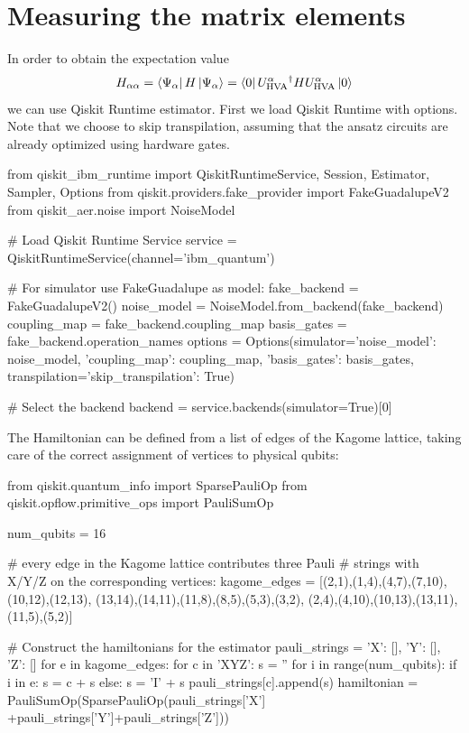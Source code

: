 \documentclass[a4paper,12pt]{article}
\begin{document}
\section{Measuring the matrix elements}\label{sec:measuring}
In order to obtain the expectation value
\begin{equation}
H_{\alpha\alpha} = \left\langle{\Psi_\alpha}\right\vert H \left\vert{\Psi_\alpha}\right\rangle 
= \left\langle{0}\right\vert U_\text{HVA}^\alpha{}^\dagger H U_\text{HVA}^\alpha \left\vert{0}\right\rangle
\end{equation}
we can use Qiskit Runtime estimator. First we load Qiskit Runtime with options. Note that we choose to skip transpilation, assuming that the ansatz circuits are already optimized using hardware gates.
\begin{python}
from qiskit_ibm_runtime import QiskitRuntimeService,
     Session, Estimator, Sampler, Options
from qiskit.providers.fake_provider import FakeGuadalupeV2
from qiskit_aer.noise import NoiseModel

# Load Qiskit Runtime Service
service = QiskitRuntimeService(channel='ibm_quantum')

# For simulator use FakeGuadalupe as model:
fake_backend = FakeGuadalupeV2()
noise_model  = NoiseModel.from_backend(fake_backend)
coupling_map = fake_backend.coupling_map
basis_gates  = fake_backend.operation_names
options = Options(simulator={'noise_model':  noise_model,
                             'coupling_map': coupling_map,
                             'basis_gates':  basis_gates}, 
                  transpilation={'skip_transpilation': True})

# Select the backend
backend = service.backends(simulator=True)[0]
\end{python}
%
The Hamiltonian can be defined from a list of edges of the Kagome lattice, taking care of the correct assignment of vertices to physical qubits:
\begin{python}
from qiskit.quantum_info import SparsePauliOp
from qiskit.opflow.primitive_ops import PauliSumOp

num_qubits = 16

# every edge in the Kagome lattice contributes three Pauli
# strings with X/Y/Z on the corresponding vertices:
kagome_edges = [(2,1),(1,4),(4,7),(7,10),(10,12),(12,13),
                (13,14),(14,11),(11,8),(8,5),(5,3),(3,2),
                (2,4),(4,10),(10,13),(13,11),(11,5),(5,2)]
    
# Construct the hamiltonians for the estimator
pauli_strings = {'X': [], 'Y': [], 'Z': []}
for e in kagome_edges:
    for c in 'XYZ':
        s = ''
        for i in range(num_qubits):
            if i in e:
                s = c + s
            else:
                s = 'I' + s
        pauli_strings[c].append(s)
hamiltonian = PauliSumOp(SparsePauliOp(pauli_strings['X']
              +pauli_strings['Y']+pauli_strings['Z']))
\end{python}
\end{document}
